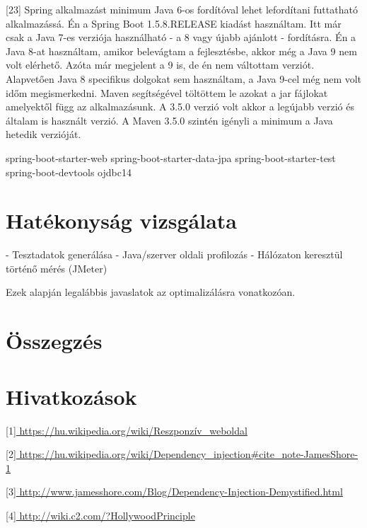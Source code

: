 \documentclass[11pt]{article}
\begin{document}
[23] Spring alkalmazást minimum Java 6-os fordítóval lehet lefordítani futtatható alkalmazássá. Én a Spring Boot 1.5.8.RELEASE kiadást használtam. Itt már csak a Java 7-es verziója használható - a 8 vagy újabb ajánlott - fordításra. Én a Java 8-at használtam, amikor belevágtam a fejlesztésbe, akkor még a Java 9 nem volt elérhető. Azóta már megjelent a 9 is, de én nem váltottam verziót. Alapvetően Java 8 specifikus dolgokat sem használtam, a Java 9-cel még nem volt időm megismerkedni.
Maven segítségével töltöttem le azokat a jar fájlokat amelyektől függ az alkalmazásunk. A 3.5.0 verzió volt akkor a legújabb verzió és általam is használt verzió. A Maven 3.5.0 szintén igényli a minimum a Java hetedik verzióját.

spring-boot-starter-web
spring-boot-starter-data-jpa
spring-boot-starter-test
spring-boot-devtools
ojdbc14 %

\section{Hatékonyság vizsgálata}


- Tesztadatok generálása
- Java/szerver oldali profilozás
- Hálózaton keresztül történő mérés (JMeter)

Ezek alapján legalábbis javaslatok az optimalizálásra vonatkozóan.

\section*{Összegzés}


\section*{Hivatkozások}

[1]\url{ https://hu.wikipedia.org/wiki/Reszponzív\_weboldal }

[2]\url{ https://hu.wikipedia.org/wiki/Dependency\_injection#cite_note-JamesShore-1 }	

[3]\url{ http://www.jamesshore.com/Blog/Dependency-Injection-Demystified.html }

[4]\url{ http://wiki.c2.com/?HollywoodPrinciple }
\end{document}
